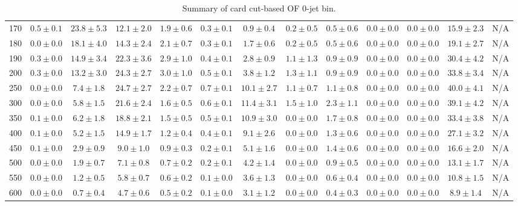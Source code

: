 \begin{table}
{\begin{center}
\begin{tabular}{l | c c | c c c c c c c c  | c c}
170 & $0.5\pm0.1$ & $23.8\pm5.3$ & $12.1\pm2.0$ & $1.9\pm0.6$ & $0.3\pm0.1$ & $0.9\pm0.4$ & $0.2\pm0.5$ & $0.5\pm0.6$ & $0.0\pm0.0$ & $0.0\pm0.0$ & $15.9\pm2.3$ & N/A \\
180 & $0.0\pm0.0$ & $18.1\pm4.0$ & $14.3\pm2.4$ & $2.1\pm0.7$ & $0.3\pm0.1$ & $1.7\pm0.6$ & $0.2\pm0.5$ & $0.5\pm0.6$ & $0.0\pm0.0$ & $0.0\pm0.0$ & $19.1\pm2.7$ & N/A \\
190 & $0.3\pm0.0$ & $14.9\pm3.4$ & $22.3\pm3.6$ & $2.9\pm1.0$ & $0.4\pm0.1$ & $2.8\pm0.9$ & $1.1\pm1.3$ & $0.9\pm0.9$ & $0.0\pm0.0$ & $0.0\pm0.0$ & $30.4\pm4.2$ & N/A \\
200 & $0.3\pm0.0$ & $13.2\pm3.0$ & $24.3\pm2.7$ & $3.0\pm1.0$ & $0.5\pm0.1$ & $3.8\pm1.2$ & $1.3\pm1.1$ & $0.9\pm0.9$ & $0.0\pm0.0$ & $0.0\pm0.0$ & $33.8\pm3.4$ & N/A \\
250 & $0.0\pm0.0$ & $7.4\pm1.8$ & $24.7\pm2.7$ & $2.2\pm0.7$ & $0.7\pm0.1$ & $10.1\pm2.7$ & $1.1\pm0.7$ & $1.1\pm0.8$ & $0.0\pm0.0$ & $0.0\pm0.0$ & $40.0\pm4.1$ & N/A \\
300 & $0.0\pm0.0$ & $5.8\pm1.5$ & $21.6\pm2.4$ & $1.6\pm0.5$ & $0.6\pm0.1$ & $11.4\pm3.1$ & $1.5\pm1.0$ & $2.3\pm1.1$ & $0.0\pm0.0$ & $0.0\pm0.0$ & $39.1\pm4.2$ & N/A \\
350 & $0.1\pm0.0$ & $6.2\pm1.8$ & $18.8\pm2.1$ & $1.5\pm0.5$ & $0.5\pm0.1$ & $10.9\pm3.0$ & $0.0\pm0.0$ & $1.7\pm0.8$ & $0.0\pm0.0$ & $0.0\pm0.0$ & $33.4\pm3.8$ & N/A \\
400 & $0.1\pm0.0$ & $5.2\pm1.5$ & $14.9\pm1.7$ & $1.2\pm0.4$ & $0.4\pm0.1$ & $9.1\pm2.6$ & $0.0\pm0.0$ & $1.3\pm0.6$ & $0.0\pm0.0$ & $0.0\pm0.0$ & $27.1\pm3.2$ & N/A \\
450 & $0.1\pm0.0$ & $2.9\pm0.9$ & $9.0\pm1.0$ & $0.9\pm0.3$ & $0.2\pm0.1$ & $5.1\pm1.6$ & $0.0\pm0.0$ & $1.4\pm0.6$ & $0.0\pm0.0$ & $0.0\pm0.0$ & $16.6\pm2.0$ & N/A \\
500 & $0.0\pm0.0$ & $1.9\pm0.7$ & $7.1\pm0.8$ & $0.7\pm0.2$ & $0.2\pm0.1$ & $4.2\pm1.4$ & $0.0\pm0.0$ & $0.9\pm0.5$ & $0.0\pm0.0$ & $0.0\pm0.0$ & $13.1\pm1.7$ & N/A \\
550 & $0.0\pm0.0$ & $1.2\pm0.5$ & $5.8\pm0.7$ & $0.6\pm0.2$ & $0.1\pm0.0$ & $3.6\pm1.3$ & $0.0\pm0.0$ & $0.6\pm0.4$ & $0.0\pm0.0$ & $0.0\pm0.0$ & $10.8\pm1.5$ & N/A \\
600 & $0.0\pm0.0$ & $0.7\pm0.4$ & $4.7\pm0.6$ & $0.5\pm0.2$ & $0.1\pm0.0$ & $3.1\pm1.2$ & $0.0\pm0.0$ & $0.4\pm0.3$ & $0.0\pm0.0$ & $0.0\pm0.0$ & $8.9\pm1.4$ & N/A \\
\hline
\end{tabular}
\end{center}
}
\caption{Summary of card cut-based OF 0-jet bin.}
\end{table}
